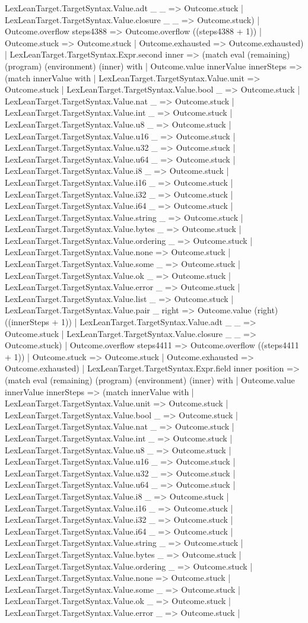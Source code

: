 \documentclass[11pt]{article}
\begin{document}
LexLeanTarget.TargetSyntax.Value.adt \_ \_ => Outcome.stuck | LexLeanTarget.TargetSyntax.Value.closure \_ \_ => Outcome.stuck) | Outcome.overflow steps4388 => Outcome.overflow ((steps4388 + 1)) | Outcome.stuck => Outcome.stuck | Outcome.exhausted => Outcome.exhausted) | LexLeanTarget.TargetSyntax.Expr.second inner => (match eval (remaining) (program) (environment) (inner) with | Outcome.value innerValue innerSteps => (match innerValue with | LexLeanTarget.TargetSyntax.Value.unit => Outcome.stuck | LexLeanTarget.TargetSyntax.Value.bool \_ => Outcome.stuck | LexLeanTarget.TargetSyntax.Value.nat \_ => Outcome.stuck | LexLeanTarget.TargetSyntax.Value.int \_ => Outcome.stuck | LexLeanTarget.TargetSyntax.Value.u8 \_ => Outcome.stuck | LexLeanTarget.TargetSyntax.Value.u16 \_ => Outcome.stuck | LexLeanTarget.TargetSyntax.Value.u32 \_ => Outcome.stuck | LexLeanTarget.TargetSyntax.Value.u64 \_ => Outcome.stuck | LexLeanTarget.TargetSyntax.Value.i8 \_ => Outcome.stuck | LexLeanTarget.TargetSyntax.Value.i16 \_ => Outcome.stuck | LexLeanTarget.TargetSyntax.Value.i32 \_ => Outcome.stuck | LexLeanTarget.TargetSyntax.Value.i64 \_ => Outcome.stuck | LexLeanTarget.TargetSyntax.Value.string \_ => Outcome.stuck | LexLeanTarget.TargetSyntax.Value.bytes \_ => Outcome.stuck | LexLeanTarget.TargetSyntax.Value.ordering \_ => Outcome.stuck | LexLeanTarget.TargetSyntax.Value.none => Outcome.stuck | LexLeanTarget.TargetSyntax.Value.some \_ => Outcome.stuck | LexLeanTarget.TargetSyntax.Value.ok \_ => Outcome.stuck | LexLeanTarget.TargetSyntax.Value.error \_ => Outcome.stuck | LexLeanTarget.TargetSyntax.Value.list \_ => Outcome.stuck | LexLeanTarget.TargetSyntax.Value.pair \_ right => Outcome.value (right) ((innerSteps + 1)) | LexLeanTarget.TargetSyntax.Value.adt \_ \_ => Outcome.stuck | LexLeanTarget.TargetSyntax.Value.closure \_ \_ => Outcome.stuck) | Outcome.overflow steps4411 => Outcome.overflow ((steps4411 + 1)) | Outcome.stuck => Outcome.stuck | Outcome.exhausted => Outcome.exhausted) | LexLeanTarget.TargetSyntax.Expr.field inner position => (match eval (remaining) (program) (environment) (inner) with | Outcome.value innerValue innerSteps => (match innerValue with | LexLeanTarget.TargetSyntax.Value.unit => Outcome.stuck | LexLeanTarget.TargetSyntax.Value.bool \_ => Outcome.stuck | LexLeanTarget.TargetSyntax.Value.nat \_ => Outcome.stuck | LexLeanTarget.TargetSyntax.Value.int \_ => Outcome.stuck | LexLeanTarget.TargetSyntax.Value.u8 \_ => Outcome.stuck | LexLeanTarget.TargetSyntax.Value.u16 \_ => Outcome.stuck | LexLeanTarget.TargetSyntax.Value.u32 \_ => Outcome.stuck | LexLeanTarget.TargetSyntax.Value.u64 \_ => Outcome.stuck | LexLeanTarget.TargetSyntax.Value.i8 \_ => Outcome.stuck | LexLeanTarget.TargetSyntax.Value.i16 \_ => Outcome.stuck | LexLeanTarget.TargetSyntax.Value.i32 \_ => Outcome.stuck | LexLeanTarget.TargetSyntax.Value.i64 \_ => Outcome.stuck | LexLeanTarget.TargetSyntax.Value.string \_ => Outcome.stuck | LexLeanTarget.TargetSyntax.Value.bytes \_ => Outcome.stuck | LexLeanTarget.TargetSyntax.Value.ordering \_ => Outcome.stuck | LexLeanTarget.TargetSyntax.Value.none => Outcome.stuck | LexLeanTarget.TargetSyntax.Value.some \_ => Outcome.stuck | LexLeanTarget.TargetSyntax.Value.ok \_ => Outcome.stuck | LexLeanTarget.TargetSyntax.Value.error \_ => Outcome.stuck | 
\end{document}
